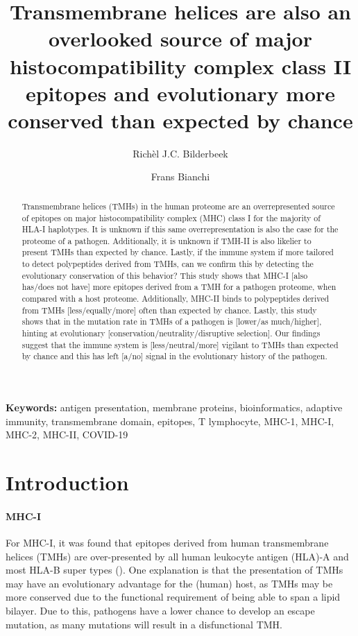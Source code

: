 \documentclass{article}
\title{
  Transmembrane helices are also 
  an overlooked source of major histocompatibility complex class II epitopes
  and evolutionary more conserved than expected by chance
}
\author[1]{Richèl J.C. Bilderbeek}
\author[2]{Frans Bianchi}
\affil[1]{Groningen Institute for Evolutionary Life Sciences, University of 
Groningen, Groningen, The Netherlands}
\affil[2]{Frans' Institute, University of Groningen, Groningen, The Netherlands}
\begin{document}
\maketitle

\begin{abstract}

Transmembrane helices (TMHs) in the human proteome
are an overrepresented source of epitopes on major 
histocompatibility complex (MHC) class I for the majority of HLA-I haplotypes. 
It is unknown if this same overrepresentation
is also the case for the proteome of a pathogen.
Additionally, it is unknown if TMH-II is also likelier to present
TMHs than expected by chance. 
Lastly, if the immune system if more tailored to detect polypeptides
derived from TMHs, can we confirm this by detecting the evolutionary
conservation of this behavior?
This study shows that MHC-I [also has/does not have] more
epitopes derived from a TMH for a pathogen proteome, when compared with
a host proteome.
Additionally, MHC-II binds to polypeptides derived from TMHs 
[less/equally/more] often than expected by chance.
Lastly, this study shows that in the mutation rate in TMHs of a pathogen
is [lower/as much/higher], hinting at 
evolutionary [conservation/neutrality/disruptive selection].
Our findings suggest that the immune system is [less/neutral/more]
vigilant to TMHs than expected by chance and this has left [a/no]
signal in the evolutionary history of the pathogen.

\end{abstract}

{\bf Keywords:} antigen presentation, membrane proteins, bioinformatics, 
adaptive immunity, transmembrane domain, epitopes, T lymphocyte, 
MHC-1, MHC-I, MHC-2, MHC-II, COVID-19

\section{Introduction}

\paragraph{MHC-I}

For MHC-I, it was found that epitopes derived 
from human transmembrane helices (TMHs)
are over-presented by all human leukocyte antigen (HLA)-A and 
most HLA-B super types (\cite{bianchi2017}). 
One explanation is that the presentation of TMHs 
may have an evolutionary advantage for 
the (human) host, as TMHs may be more 
conserved due to the functional requirement of being able to span a lipid 
bilayer. 
Due to this, pathogens have a lower chance to develop an escape mutation,
as many mutations will result in a disfunctional TMH.
\end{document}
